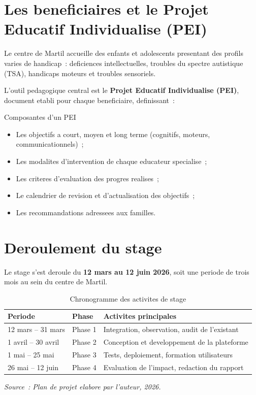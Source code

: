 \documentclass[12pt,a4paper,openany]{report}
\begin{document}
\section{Les beneficiaires et le Projet Educatif Individualise (PEI)}

Le centre de Martil accueille des enfants et adolescents presentant
des profils varies de handicap~: deficiences intellectuelles, troubles
du spectre autistique (TSA), handicaps moteurs et troubles sensoriels.

\vspace{0.3cm}
L'outil pedagogique central est le \textbf{Projet Educatif Individualise
(PEI)}, document etabli pour chaque beneficiaire, definissant~:

\begin{encadre}{Composantes d'un PEI}
\begin{itemize}
  \item Les objectifs a court, moyen et long terme (cognitifs, moteurs,
    communicationnels)~;
  \item Les modalites d'intervention de chaque educateur specialise~;
  \item Les criteres d'evaluation des progres realises~;
  \item Le calendrier de revision et d'actualisation des objectifs~;
  \item Les recommandations adressees aux familles.
\end{itemize}
\end{encadre}

\section{Deroulement du stage}

Le stage s'est deroule du \textbf{12 mars au 12 juin 2026}, soit une
periode de trois mois au sein du centre de Martil.

\begin{table}[H]
\centering
\caption{Chronogramme des activites de stage}
\label{tab:chronogramme}
\begin{tabularx}{\textwidth}{llX}
\toprule
\textbf{Periode} & \textbf{Phase} & \textbf{Activites principales}\\
\midrule
12 mars -- 31 mars & Phase 1 & Integration, observation, audit de l'existant\\
1 avril -- 30 avril & Phase 2 & Conception et developpement de la plateforme\\
1 mai -- 25 mai & Phase 3 & Tests, deploiement, formation utilisateurs\\
26 mai -- 12 juin & Phase 4 & Evaluation de l'impact, redaction du rapport\\
\bottomrule
\end{tabularx}
\vspace{0.1cm}
\small\textit{Source~: Plan de projet elabore par l'auteur, 2026.}
\end{table}
\end{document}
